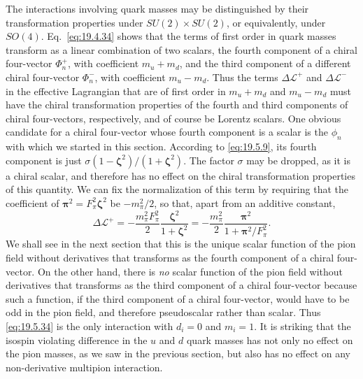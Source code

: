 The interactions involving quark masses may be distinguished by their transformation properties under $SU(2)\times SU(2)$, or equivalently, under $SO(4)$. Eq.~\eqref{eq:19.4.34} shows that the terms of first order in quark masses transform as a linear combination of two scalars, the fourth component of a chiral four-vector $\Phi_n^+$, with coefficient $m_u+m_d$, and the third component of a different chiral four-vector $\Phi_n^-$, with coefficient $m_u-m_d$. Thus the terms $\Delta\mathcal L^+$ and $\Delta\mathcal L^-$ in the effective Lagrangian that are of first order in $m_u+m_d$ and $m_u-m_d$ must have the chiral transformation properties of the fourth and third components of chiral four-vectors, respectively, and of course be Lorentz scalars. One obvious candidate for a chiral four-vector whose fourth component is a scalar is the $\phi_n$ with which we started in this section. According to \eqref{eq:19.5.9}, its fourth component is just $\sigma(1-\boldsymbol{\zeta}^2)/(1+\boldsymbol{\zeta}^2)$. The factor $\sigma$ may be dropped, as it is a chiral scalar, and therefore has no effect on the chiral transformation properties of this quantity. We can fix the normalization of this term by requiring that the coefficient of $\boldsymbol{\pi}^2=F_\pi^2\boldsymbol{\zeta}^2$ be $-m_\pi^2/2$, so that, apart from an additive constant,
\begin{equation}
\Delta\mathcal L^+
=-\frac{m_\pi^2F_\pi^2}{2}
\frac{\boldsymbol{\zeta}^2}{1+\boldsymbol{\zeta}^2}
=-\frac{m_\pi^2}{2}
\frac{\boldsymbol{\pi}^2}
{1+\boldsymbol{\pi}^2/F_\pi^2}.
\tag{19.5.34}\label{eq:19.5.34}
\end{equation}
We shall see in the next section that this is the unique scalar function of the pion field without derivatives that transforms as the fourth component of a chiral four-vector. On the other hand, there is \emph{no} scalar function of the pion field without derivatives that transforms as the third component of a chiral four-vector because such a function, if the third component of a chiral four-vector, would have to be odd in the pion field, and therefore pseudoscalar rather than scalar. Thus \eqref{eq:19.5.34} is the only interaction with $d_i=0$ and $m_i=1$. It is striking that the isospin violating difference in the $u$ and $d$ quark masses has not only no effect on the pion masses, as we saw in the previous section, but also has no effect on any non-derivative multipion interaction.

